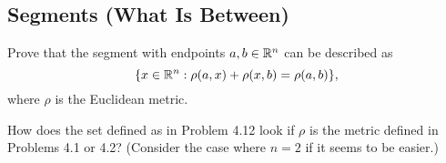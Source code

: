 \subsection{Segments (What Is Between)}

\begin{minorEx}
    Prove that the segment with endpoints $a,b \in \mathbb{R}^n$ can be described as 
    \[
        \{x \in \mathbb{R}^n : \rho(a,x) + \rho(x,b) = \rho(a, b)\},
    \]
    where $\rho$ is the Euclidean metric.
\end{minorEx}

\begin{minorEx}
    How does the set defined as in Problem 4.12 look if $\rho$ is the metric
    defined in Problems 4.1 or 4.2? (Consider the case where $n = 2$ if it seems
    to be easier.)
\end{minorEx}
